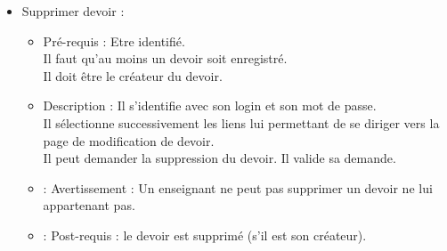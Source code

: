 \begin{itemize}
\begin{itemize}
		\item Supprimer devoir :
			\begin{itemize}
			\item Pr{\'e}-requis : Etre identifi{\'e}.\\
			Il faut qu'au moins un devoir soit enregistr{\'e}.\\
			Il doit {\^e}tre le cr{\'e}ateur du devoir.
			\item Description : Il s'identifie avec son login et son mot de passe.\\
			Il s{\'e}lectionne successivement les liens lui permettant de se diriger vers la page de modification de devoir.\\
			Il peut demander la suppression du devoir. Il valide sa demande.
			\item : Avertissement : Un enseignant ne peut pas supprimer un devoir ne lui appartenant pas.
			\item : Post-requis : le devoir est supprim{\'e} (s'il est son cr{\'e}ateur).\\
			\end{itemize}

		\end{itemize}
	\end{itemize}

